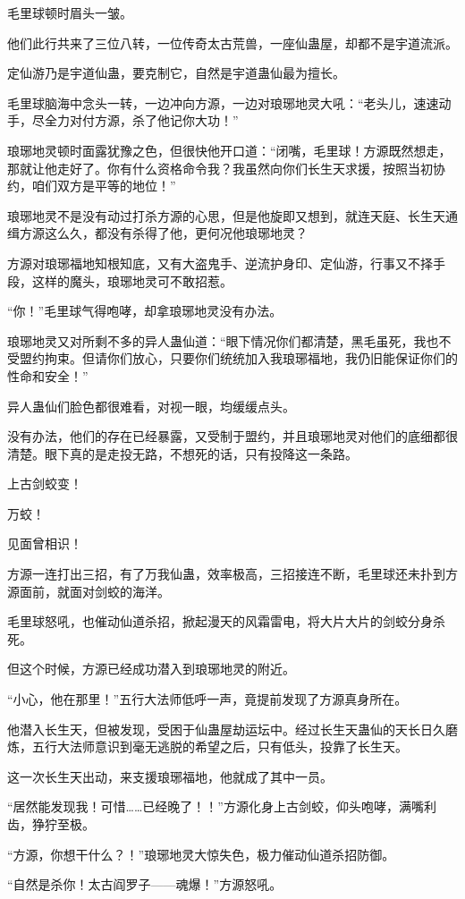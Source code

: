 \begin{this_body}
毛里球顿时眉头一皱。

他们此行共来了三位八转，一位传奇太古荒兽，一座仙蛊屋，却都不是宇道流派。

定仙游乃是宇道仙蛊，要克制它，自然是宇道蛊仙最为擅长。

毛里球脑海中念头一转，一边冲向方源，一边对琅琊地灵大吼：“老头儿，速速动手，尽全力对付方源，杀了他记你大功！”

琅琊地灵顿时面露犹豫之色，但很快他开口道：“闭嘴，毛里球！方源既然想走，那就让他走好了。你有什么资格命令我？我虽然向你们长生天求援，按照当初协约，咱们双方是平等的地位！”

琅琊地灵不是没有动过打杀方源的心思，但是他旋即又想到，就连天庭、长生天通缉方源这么久，都没有杀得了他，更何况他琅琊地灵？

方源对琅琊福地知根知底，又有大盗鬼手、逆流护身印、定仙游，行事又不择手段，这样的魔头，琅琊地灵可不敢招惹。

“你！”毛里球气得咆哮，却拿琅琊地灵没有办法。

琅琊地灵又对所剩不多的异人蛊仙道：“眼下情况你们都清楚，黑毛虽死，我也不受盟约拘束。但请你们放心，只要你们统统加入我琅琊福地，我仍旧能保证你们的性命和安全！”

异人蛊仙们脸色都很难看，对视一眼，均缓缓点头。

没有办法，他们的存在已经暴露，又受制于盟约，并且琅琊地灵对他们的底细都很清楚。眼下真的是走投无路，不想死的话，只有投降这一条路。

上古剑蛟变！

万蛟！

见面曾相识！

方源一连打出三招，有了万我仙蛊，效率极高，三招接连不断，毛里球还未扑到方源面前，就面对剑蛟的海洋。

毛里球怒吼，也催动仙道杀招，掀起漫天的风霜雷电，将大片大片的剑蛟分身杀死。

但这个时候，方源已经成功潜入到琅琊地灵的附近。

“小心，他在那里！”五行大法师低呼一声，竟提前发现了方源真身所在。

他潜入长生天，但被发现，受困于仙蛊屋劫运坛中。经过长生天蛊仙的天长日久磨炼，五行大法师意识到毫无逃脱的希望之后，只有低头，投靠了长生天。

这一次长生天出动，来支援琅琊福地，他就成了其中一员。

“居然能发现我！可惜……已经晚了！！”方源化身上古剑蛟，仰头咆哮，满嘴利齿，狰狞至极。

“方源，你想干什么？！”琅琊地灵大惊失色，极力催动仙道杀招防御。

“自然是杀你！太古阎罗子——魂爆！”方源怒吼。


\end{this_body}
